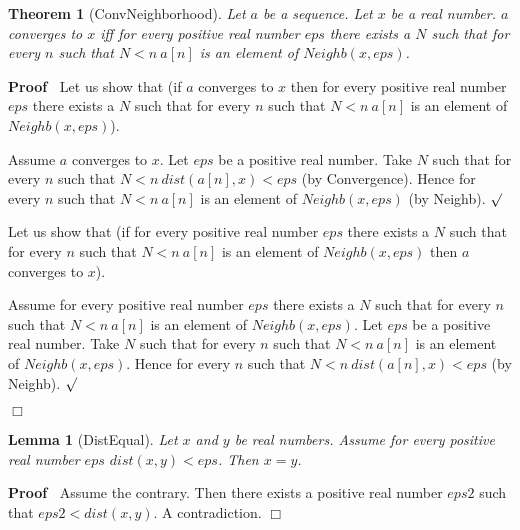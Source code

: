 \documentclass{article}
\newenvironment{forthel}{\begin{leftbar}}{\end{leftbar}}
\newenvironment{proof}{\noindent\textbf{Proof\ }}{\hspace*{\fill}$\Box$\medskip}
\newenvironment{subproof}{\begin{list}{}{}
		\item[\text{Proof}]}{\hfill $\surd$ \end{list}}
\newtheorem{lemma}{Lemma}
\newtheorem{theorem}{Theorem}
\begin{document}
\begin{forthel}
	\begin{theorem} [ConvNeighborhood]
	Let $a$ be a sequence. Let $x$ be a real number.
	$a$ converges to $x$ iff for every positive real number $eps$ there exists a $N$
	such that for every $n$ such that $N < n \ a[n]$ is an element of $Neighb(x,eps)$.
	\end{theorem}
	\begin{proof}
	Let us show that (if $a$ converges to $x$ then for every positive real number $eps$ there exists a $N$
	such that for every $n$ such that $N < n \ a[n]$ is an element of $Neighb(x,eps)$).
	\begin{subproof}
	Assume $a$ converges to $x$.
	Let $eps$ be a positive real number.
	Take $N$ such that for every $n$ such that $N < n \ dist(a[n],x) < eps$ (by Convergence).
	Hence for every $n$ such that $N < n \ a[n]$ is an element of $Neighb(x,eps)$ (by Neighb).
	\end{subproof}
	Let us show that (if for every positive real number $eps$ there exists a $N$ such that
	for every $n$ such that $N < n \ a[n]$ is an element of $Neighb(x,eps)$ then $a$ converges to $x$).
	\begin{subproof}
	Assume for every positive real number $eps$ there exists a $N$ such that
	for every $n$ such that $N < n \ a[n]$ is an element of $Neighb(x,eps)$.
	Let $eps$ be a positive real number.
	Take $N$ such that for every $n$ such that $N < n \ a[n]$ is an element of $Neighb(x,eps)$.
	Hence for every $n$ such that $N < n \ dist(a[n],x) < eps$ (by Neighb).
	\end{subproof}
	\end{proof}	
	
	\begin{lemma} [DistEqual]
	Let $x$ and $y$ be real numbers. Assume for every positive real number $eps$ $dist(x,y) < eps$.
	Then $x = y$.
	\end{lemma}
	\begin{proof}
	Assume the contrary.
	Then there exists a positive real number $eps2$ such that $eps2 < dist(x,y)$.
	A contradiction.
	\end{proof}
	

\end{forthel}
\end{document}
